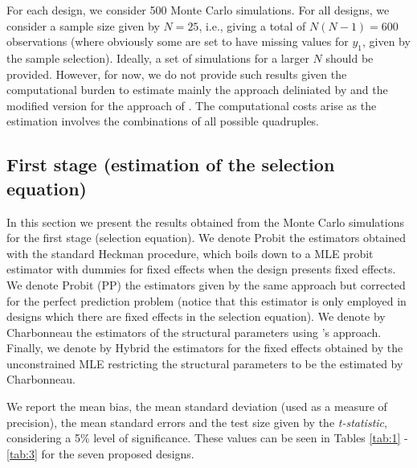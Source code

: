For each design, we consider 500 Monte Carlo simulations. For all designs, we consider a sample size given by $N=25$, i.e., giving a total of $N(N-1) = 600$ observations (where obviously some are set to have missing values for $y_1$, given by the sample selection). Ideally, a set of simulations for a larger $N$ should be provided. However, for now, we do not provide such results given the computational burden to estimate mainly the approach deliniated by \cite{charbonneau2017multiple} and the modified version for the approach of \cite{kyriazidou1997estimation}. The computational costs arise as the estimation involves the combinations of all possible quadruples. 

\subsection{First stage (estimation of the selection equation)}

In this section we present the results obtained from the Monte Carlo simulations for the first stage (selection equation). We denote Probit the estimators obtained with the standard Heckman procedure, which boils down to a MLE probit estimator with dummies for fixed effects when the design presents fixed effects. We denote Probit (PP) the estimators given by the same approach but corrected for the perfect prediction problem (notice that this estimator is only employed in designs which there are fixed effects in the selection equation). We denote by Charbonneau the estimators of the structural parameters using \cite{charbonneau2017multiple}'s approach. Finally, we denote by Hybrid the estimators for the fixed effects obtained by the unconstrained MLE restricting the structural parameters to be the estimated by Charbonneau.

We report the mean bias, the mean standard deviation (used as a measure of precision), the mean standard errors and the test size given by the \textit{t-statistic}, considering a 5\% level of significance. These values can be seen in Tables \ref{tab:1} - \ref{tab:3} for the seven proposed designs. 


